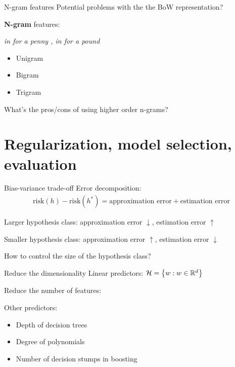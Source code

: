 \documentclass[usenames,dvipsnames,notes]{beamer}
\begin{document}
\begin{frame}
    {N-gram features}
    Potential problems with the the BoW representation?
    \vspace{3em}

    \pause
    \textbf{N-gram} features:
    \begin{center}
        \textit{in for a penny , in for a pound}
    \end{center}
    \begin{itemize}
        \item Unigram
        \item Bigram
        \item Trigram
    \end{itemize}

    What's the pros/cons of using higher order n-grams?
\end{frame}

\section{Regularization, model selection, evaluation}

\begin{frame}
    {Bias-variance trade-off}
    Error decomposition:
    \begin{align*}
        \text{risk}(h) - \text{risk}(h^*) = \text{approximation error} + \text{estimation error}
    \end{align*}
    \vspace{5em}

    Larger hypothesis class: approximation error $\downarrow$, estimation error $\uparrow$

    Smaller hypothesis class: approximation error $\uparrow$, estimation error $\downarrow$

    How to control the size of the hypothesis class?
\end{frame}

\begin{frame}
    {Reduce the dimensionality}
    Linear predictors: $\mathcal{H} = \left\{ w : w \in \mathbb{R}^d \right\}$

    Reduce the number of features:\\
    \vspace{7em}

    \pause
    Other predictors:\\
    \begin{itemize}
        \item Depth of decision trees
        \item Degree of polynomials
        \item Number of decision stumps in boosting
    \end{itemize}
\end{frame}
\end{document}
